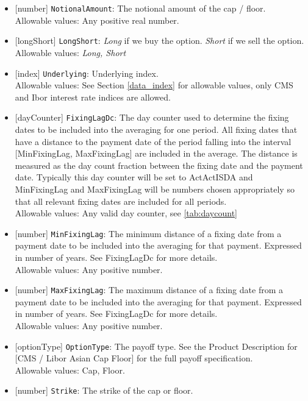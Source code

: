 \begin{itemize}
    \item{}[number] \lstinline!NotionalAmount!: The notional amount of the cap / floor. \\
    Allowable values: Any positive real number.
    \item{}[longShort] \lstinline!LongShort!: \emph{Long} if we buy the option. \emph{Short} if we sell the option.
    Allowable values: \emph{Long, Short}
  \item{}[index] \lstinline!Underlying!: Underlying index. \\
    Allowable values: See Section \ref{data_index} for allowable values, only CMS and Ibor interest rate indices are allowed.
  \item{}[dayCounter] \lstinline!FixingLagDc!: The day counter used to determine the fixing dates to be included into the averaging
    for one period. All fixing dates that have a distance to the payment date of the period falling into the interval
    [MinFixingLag, MaxFixingLag] are included in the average. The distance is measured as the day count fraction between
    the fixing date and the payment date. Typically this day counter will be set to ActActISDA and MinFixingLag and
    MaxFixingLag will be numbers chosen appropriately so that all relevant fixing dates are included for all periods. \\
    Allowable values: Any valid day counter, see \ref{tab:daycount}
  \item{}[number] \lstinline!MinFixingLag!: The minimum distance of a fixing date from a payment date to be included into the
    averaging for that payment. Expressed in number of years. See FixingLagDc for more details.\\
    Allowable values: Any positive number.
  \item{}[number] \lstinline!MaxFixingLag!: The maximum distance of a fixing date from a payment date to be included into the
    averaging for that payment. Expressed in number of years. See FixingLagDc for more details.\\
    Allowable values: Any positive number.
  \item{}[optionType] \lstinline!OptionType!: The payoff type. See the Product Description for [CMS / Libor Asian Cap Floor] for the full payoff specification.\\
    Allowable values: Cap, Floor.
  \item{}[number] \lstinline!Strike!: The strike of the cap or floor.\\

\end{itemize}
